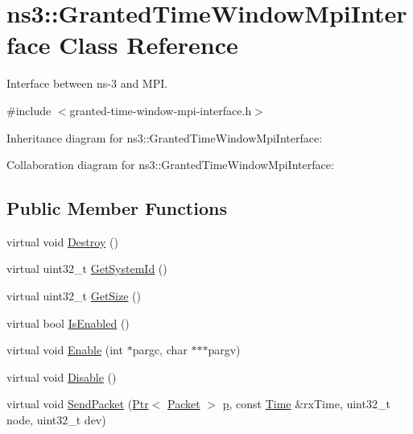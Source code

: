 \hypertarget{classns3_1_1GrantedTimeWindowMpiInterface}{}\section{ns3\+:\+:Granted\+Time\+Window\+Mpi\+Interface Class Reference}
\label{classns3_1_1GrantedTimeWindowMpiInterface}


Interface between ns-\/3 and M\+PI.  




{\ttfamily \#include $<$granted-\/time-\/window-\/mpi-\/interface.\+h$>$}



Inheritance diagram for ns3\+:\+:Granted\+Time\+Window\+Mpi\+Interface\+:


Collaboration diagram for ns3\+:\+:Granted\+Time\+Window\+Mpi\+Interface\+:
\subsection*{Public Member Functions}
\begin{DoxyCompactItemize}
\item 
virtual void \hyperlink{classns3_1_1GrantedTimeWindowMpiInterface_a85859e199ad4146e065d62fd652a7867}{Destroy} ()
\item 
virtual uint32\+\_\+t \hyperlink{classns3_1_1GrantedTimeWindowMpiInterface_a947c474d45a4f9c51a76115a8e6a5e01}{Get\+System\+Id} ()
\item 
virtual uint32\+\_\+t \hyperlink{classns3_1_1GrantedTimeWindowMpiInterface_aff7518c8d1495ae1ea3ee23e5017d21c}{Get\+Size} ()
\item 
virtual bool \hyperlink{classns3_1_1GrantedTimeWindowMpiInterface_addb5930995091a33a7fddad4e317c30f}{Is\+Enabled} ()
\item 
virtual void \hyperlink{classns3_1_1GrantedTimeWindowMpiInterface_a12fcf9cd299f5700789aa791226067da}{Enable} (int $\ast$pargc, char $\ast$$\ast$$\ast$pargv)
\item 
virtual void \hyperlink{classns3_1_1GrantedTimeWindowMpiInterface_a6d7a3434123aa5e2e6d6dbb29e8bcc77}{Disable} ()
\item 
virtual void \hyperlink{classns3_1_1GrantedTimeWindowMpiInterface_ac3b6bb4ae10c6e49001d664871b201c6}{Send\+Packet} (\hyperlink{classns3_1_1Ptr}{Ptr}$<$ \hyperlink{classns3_1_1Packet}{Packet} $>$ \hyperlink{lte__link__budget__x2__handover__measures_8m_ac9de518908a968428863f829398a4e62}{p}, const \hyperlink{classns3_1_1Time}{Time} \&rx\+Time, uint32\+\_\+t node, uint32\+\_\+t dev)
\end{DoxyCompactItemize}
